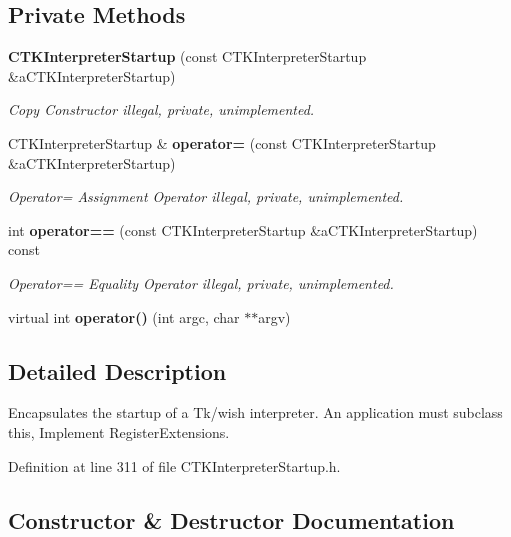\subsection*{Private Methods}
\begin{CompactItemize}
\item 
{\bf CTKInterpreter\-Startup} (const CTKInterpreter\-Startup \&a\-CTKInterpreter\-Startup)
\begin{CompactList}\small\item\em Copy Constructor illegal, private, unimplemented.\item\end{CompactList}\item 
CTKInterpreter\-Startup \& {\bf operator=} (const CTKInterpreter\-Startup \&a\-CTKInterpreter\-Startup)
\begin{CompactList}\small\item\em Operator= Assignment Operator illegal, private, unimplemented.\item\end{CompactList}\item 
int {\bf operator==} (const CTKInterpreter\-Startup \&a\-CTKInterpreter\-Startup) const
\begin{CompactList}\small\item\em Operator== Equality Operator illegal, private, unimplemented.\item\end{CompactList}\item 
virtual int {\bf operator()} (int argc, char $\ast$$\ast$argv)
\end{CompactItemize}


\subsection{Detailed Description}
Encapsulates the startup of a Tk/wish interpreter. An application must subclass this, Implement Register\-Extensions. 



Definition at line 311 of file CTKInterpreter\-Startup.h.

\subsection{Constructor \& Destructor Documentation}
